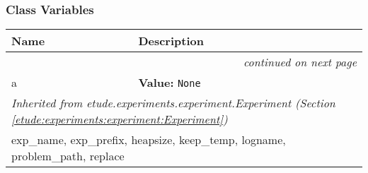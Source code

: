   \subsubsection{Class Variables}

    \vspace{-1cm}
\hspace{\varindent}\begin{longtable}{|p{\varnamewidth}|p{\vardescrwidth}|l}
\cline{1-2}
\cline{1-2} \centering \textbf{Name} & \centering \textbf{Description}& \\
\cline{1-2}
\endhead\cline{1-2}\multicolumn{3}{r}{\small\textit{continued on next page}}\\\endfoot\cline{1-2}
\endlastfoot\raggedright a\- & \raggedright \textbf{Value:} 
{\tt None}&\\
\cline{1-2}
\multicolumn{2}{|l|}{\textit{Inherited from etude.experiments.experiment.Experiment \textit{(Section \ref{etude:experiments:experiment:Experiment})}}}\\
\multicolumn{2}{|p{\varwidth}|}{\raggedright exp\_name, exp\_prefix, heapsize, keep\_temp, logname, problem\_path, replace}\\
\cline{1-2}
\end{longtable}

